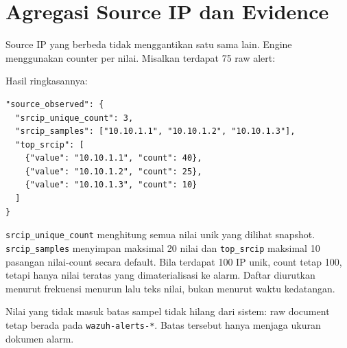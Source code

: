\documentclass[11pt,a4paper,oneside]{report}
\DeclareRobustCommand{\code}[1]{\nolinkurl{#1}}
\begin{document}
\chapter{Agregasi Source IP dan Evidence}

Source IP yang berbeda tidak menggantikan satu sama lain. Engine menggunakan
counter per nilai. Misalkan terdapat 75 raw alert:

\begin{center}
\end{center}

Hasil ringkasannya:

\begin{lstlisting}
"source_observed": {
  "srcip_unique_count": 3,
  "srcip_samples": ["10.10.1.1", "10.10.1.2", "10.10.1.3"],
  "top_srcip": [
    {"value": "10.10.1.1", "count": 40},
    {"value": "10.10.1.2", "count": 25},
    {"value": "10.10.1.3", "count": 10}
  ]
}
\end{lstlisting}

\code{srcip\_unique\_count} menghitung semua nilai unik yang dilihat snapshot.
\code{srcip\_samples} menyimpan maksimal 20 nilai dan \code{top\_srcip} maksimal
10 pasangan nilai-count secara default. Bila terdapat 100 IP unik, count tetap 100,
tetapi hanya nilai teratas yang dimaterialisasi ke alarm. Daftar diurutkan menurut
frekuensi menurun lalu teks nilai, bukan menurut waktu kedatangan.

Nilai yang tidak masuk batas sampel tidak hilang dari sistem: raw document tetap
berada pada \code{wazuh-alerts-*}. Batas tersebut hanya menjaga ukuran dokumen alarm.
\end{document}
